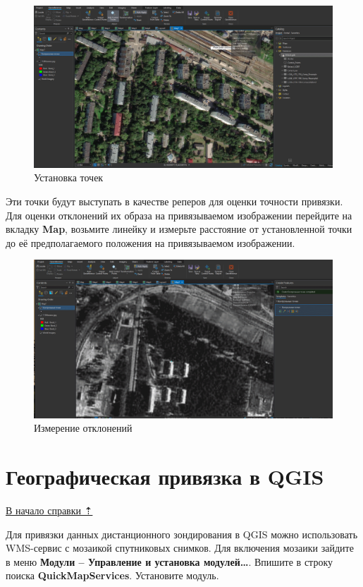 \documentclass[
  12pt,
]{book}
\begin{document}
\begin{figure}
\centering
\includegraphics{images/Ref02/Arc_Control_Points.gif}
\caption{Установка точек}
\end{figure}

Эти точки будут выступать в качестве реперов для оценки точности привязки. Для оценки отклонений их образа на привязываемом изображении перейдите на вкладку \textbf{Map}, возьмите линейку и измерьте расстояние от установленной точки до её предполагаемого положения на привязываемом изображении.

\begin{figure}
\centering
\includegraphics{images/Ref02/Arc_Measuring.gif}
\caption{Измерение отклонений}
\end{figure}

\hypertarget{georeference-qgis}{%
\section{Географическая привязка в QGIS}\label{georeference-qgis}}

\protect\hyperlink{georeference}{В начало справки ⇡}

Для привязки данных дистанционного зондирования в QGIS можно использовать WMS-сервис с мозаикой спутниковых снимков. Для включения мозаики зайдите в меню \textbf{Модули -- Управление и установка модулей\ldots{}}. Впишите в строку поиска \textbf{QuickMapServices}. Установите модуль.
\end{document}
